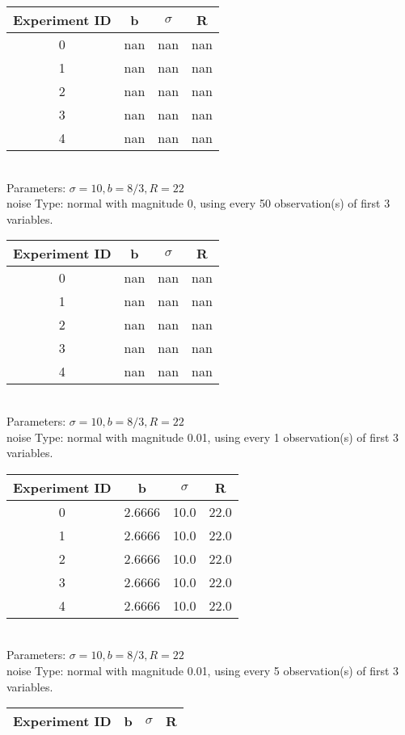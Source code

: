 \begin{multicols}{3}
\begin{tabular}{cccc}
\hline Experiment ID & b & $\sigma$ & R \\ \hline 
0 & nan & nan & nan\\ \hline 
 1 & nan & nan & nan\\ \hline 
 2 & nan & nan & nan\\ \hline 
 3 & nan & nan & nan\\ \hline 
 4 & nan & nan & nan\\ \hline 
 \end{tabular}\\
Parameters: $\sigma=10, b=8/3, R=22$\\
noise Type: normal with magnitude 0, using every 50 observation(s) of first 3 variables.\\
\begin{tabular}{cccc}
\hline Experiment ID & b & $\sigma$ & R \\ \hline 
0 & nan & nan & nan\\ \hline 
 1 & nan & nan & nan\\ \hline 
 2 & nan & nan & nan\\ \hline 
 3 & nan & nan & nan\\ \hline 
 4 & nan & nan & nan\\ \hline 
 \end{tabular}\\
Parameters: $\sigma=10, b=8/3, R=22$\\
noise Type: normal with magnitude 0.01, using every 1 observation(s) of first 3 variables.\\
\begin{tabular}{cccc}
\hline Experiment ID & b & $\sigma$ & R \\ \hline 
0 & 2.6666 & 10.0 & 22.0\\ \hline 
 1 & 2.6666 & 10.0 & 22.0\\ \hline 
 2 & 2.6666 & 10.0 & 22.0\\ \hline 
 3 & 2.6666 & 10.0 & 22.0\\ \hline 
 4 & 2.6666 & 10.0 & 22.0\\ \hline 
 \end{tabular}\\
Parameters: $\sigma=10, b=8/3, R=22$\\
noise Type: normal with magnitude 0.01, using every 5 observation(s) of first 3 variables.\\
\begin{tabular}{cccc}
\hline Experiment ID & b & $\sigma$ & R \\ \hline 

\end{tabular}
\end{multicols}

